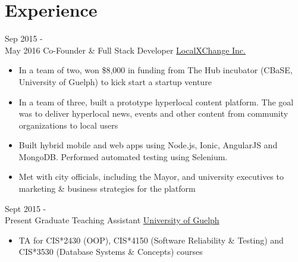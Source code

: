 \documentclass[letterpaper,UTF8]{twentysecondcv} %
\begin{document}
\section{Experience}

\begin{twenty} %
	\twentyitem
    	{Sep 2015 - \\May 2016}
        {Co-Founder \& Full Stack Developer}
        {\href{http://www.localxchange.ca/}{LocalXChange Inc.}}
        {}
        {
        {\begin{itemize}
        \item In a team of two, won \$8,000 in funding from The Hub incubator (CBaSE, University of Guelph) to kick start a startup venture
        \item In a team of three, built a prototype hyperlocal content platform. The goal was to deliver hyperlocal news, events and other content from community organizations to local users
        \item Built hybrid mobile and web apps using Node.js, Ionic, AngularJS and MongoDB. Performed automated testing using Selenium.
        \item Met with city officials, including the Mayor, and university executives to marketing \& business strategies for the platform 
    \end{itemize}}
        }
        
    \twentyitem
   		{Sept 2015 - \\ Present}
        {Graduate Teaching Assistant}
        {\href{http://www.uoguelph.ca}{University of Guelph}}
        {}
        {
        {\begin{itemize}
        \item TA for CIS*2430 (OOP), CIS*4150 (Software Reliability \& Testing) and CIS*3530 (Database Systems \& Concepts) courses
    \end{itemize}}
        }
        

\end{twenty}
\end{document}

